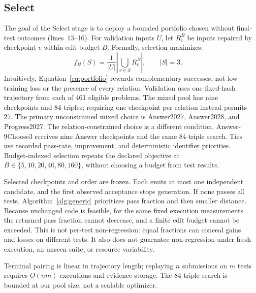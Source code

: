 \documentclass[10pt,conference]{IEEEtran}
\begin{document}
\subsection{Select}
\label{sec:select}
The goal of the Select stage is to deploy a bounded portfolio chosen without final-test outcomes (lines~13--16). For validation inputs \(U\), let \(R_v^B\) be inputs repaired by checkpoint \(v\) within edit budget \(B\). Formally, selection maximizes:
\begin{equation}
 f_B(S)=\frac{1}{|U|}\left|\bigcup_{v\in S} R_v^B\right|,\qquad |S|=3.
\label{eq:portfolio}
\end{equation}
Intuitively, Equation~\eqref{eq:portfolio} rewards complementary successes, not low training loss or the presence of every relation. Validation uses one fixed-hash trajectory from each of 461 eligible problems. The mixed pool has nine checkpoints and 84 triples; requiring one checkpoint per relation instead permits 27. The primary unconstrained mixed choice is Answer2027, Answer2028, and Progress2027. The relation-constrained choice is a different condition. Answer-9Choose3 receives nine Answer checkpoints and the same 84-triple search. Ties use recorded pass-rate, improvement, and deterministic identifier priorities. Budget-indexed selection repeats the declared objective at \(B\in\{5,10,20,40,80,160\}\), without choosing a budget from test results.

Selected checkpoints and order are frozen. Each emits at most one independent candidate, and the first observed acceptance stops generation. If none passes all tests, Algorithm~\ref{alg:generic} prioritizes pass fraction and then smaller distance. Because unchanged code is feasible, for the same fixed execution measurements the returned pass fraction cannot decrease, and a finite edit budget cannot be exceeded. This is not per-test non-regression: equal fractions can conceal gains and losses on different tests. It also does not guarantee non-regression under fresh execution, an unseen suite, or resource variability.

Terminal pairing is linear in trajectory length; replaying \(n\) submissions on \(m\) tests requires \(O(nm)\) executions and evidence storage. The 84-triple search is bounded at our pool size, not a scalable optimizer.
\end{document}
